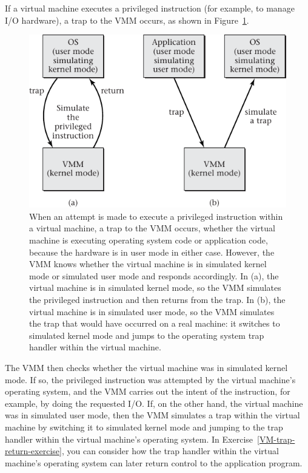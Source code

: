 If a virtual machine executes a privileged instruction (for example,
to manage I/O hardware), a trap to the VMM occurs, as shown in
Figure~\ref{VMM-modes}.
\begin{figure}
\centerline{\includegraphics{hail_f0719}}
\caption{When an attempt is made to
  execute a privileged instruction within a virtual machine, a trap to the VMM occurs, whether
  the virtual machine is executing operating system code or
  application code, because the hardware is in user mode in either case.  However, the VMM
  knows whether the virtual machine is in simulated kernel mode or
  simulated user mode and responds accordingly.  In (a), the
  virtual machine is in simulated kernel mode, so the VMM simulates
  the privileged instruction and then returns from the trap. 
  In (b), the virtual machine is in simulated user mode, so the VMM
  simulates the trap that would have occurred on a real machine: it
  switches to simulated kernel mode and jumps to the operating system
  trap handler within the virtual machine.}
\label{VMM-modes}
\end{figure}
The VMM then
checks whether the virtual machine was in simulated kernel mode.  If
so, the privileged instruction was attempted by the virtual machine's
operating system, and the VMM carries out the intent of the
instruction, for example, by doing the requested I/O.  If, on the
other hand, the virtual machine was in simulated user mode, then the
VMM simulates a trap within the virtual machine by switching it to
simulated kernel mode and jumping to the trap handler within the
virtual machine's operating system.  In
Exercise~\ref{VM-trap-return-exercise}, you can consider how the trap
handler within the virtual machine's operating system can later return
control to the application program.

